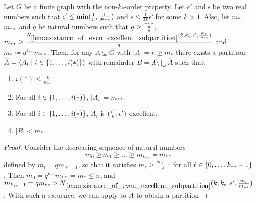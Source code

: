         \begin{lemma} \label{lem:existance_of_excellent_partition_with_equal_size}
            Let $G$ be a finite graph with the non-$k_{*}$-order property.
            Let $\epsilon'$ and $\epsilon$ be two real numbers such that
            $\epsilon' \leq \min ( \frac{1}{5}, \frac{1}{2^{k_{**}}} )$ and $\epsilon \leq \frac{1}{4k} \epsilon'$ for some $k > 1$.
            Also, let $m_*$, $m_{**}$ and $q$ be natural numbers such that $q \geq \left\lceil \frac{1}{\epsilon} \right\rceil$,
            $m_{**} > \frac{N_{\ref{lem:existance_of_even_excellent_subpartition}}
                ( k, k_*, \epsilon', \frac{m_*}{m_{**}} )}{q}$ and $m_* \coloneqq q^{k_{**}} m_{**}$.
            Then, for any $A \subseteq G$ with $|A| = n \geq m_*$ there exists a partition
            $\overline{A} = \left< A_i \mid i \in \{ 1, \dots, i(*) \} \right>$ with remainder $B = A \setminus \bigcup \overline{A}$ such that:
            \begin{enumerate}[label={\Roman*}., ref={\Roman*}, font=\rmfamily]
                \item \label{itm:existance_of_excellent_partition_with_equal_size.a} $i(*) \leq \frac{n}{m_{**}}$.
                \item \label{itm:existance_of_excellent_partition_with_equal_size.b} For all
                    $i \in \{ 1, \dots, i(*) \}$, $|A_i| = m_{**}$.
                \item \label{itm:existance_of_excellent_partition_with_equal_size.c} For all
                    $i \in \{ 1, \dots, i(*) \}$, $A_i$ is $( \frac{\epsilon'}{k}, \epsilon' )$-excellent.
                \item \label{itm:existance_of_excellent_partition_with_equal_size.d} $|B| < m_*$.
            \end{enumerate}
            \begin{proof}
                Consider the decreasing sequence of natural numbers
                \[
                    m_0 \geq m_1 \geq \dots \geq m_{k_{**}} = m_{**}
                \]
                defined by $m_\ell = q m_{\ell+1}$, so that it satisfies $m_\ell \geq \frac{m_{\ell+1}}{\epsilon}$ for all
                $\ell \in \{ 0, \dots, k_{**} - 1 \}$.
                Then $m_0 = q^{k_{**}} m_{**} = m_* \leq n$, and $m_{k_{**}-1} = q m_{**} >
                    N_{\ref{lem:existance_of_even_excellent_subpartition}}( k, k_*, \epsilon', \frac{m_*}{m_{**}} )$.
                With such a sequence, we can apply  to $A$ to obtain a partition

\end{proof}
\end{lemma}
